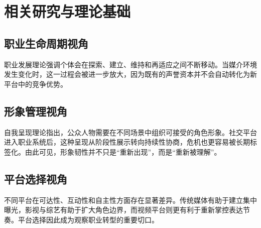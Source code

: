 \chapter{相关研究与理论基础}

\section{职业生命周期视角}

职业发展理论强调个体会在探索、建立、维持和再适应之间不断移动。当媒介环境发生变化时，这一过程会被进一步放大，因为既有的声誉资本并不会自动转化为新平台中的竞争优势。

\section{形象管理视角}

自我呈现理论指出，公众人物需要在不同场景中组织可接受的角色形象。社交平台进入职业系统后，这种呈现从阶段性展示转向持续性协商，危机也更容易被长期标签化。由此可见，形象韧性并不只是“重新出现”，而是“重新被理解”。

\section{平台选择视角}

不同平台在可达性、互动性和自主性方面存在显著差异。传统媒体有助于建立集中曝光，影视与综艺有助于扩大角色边界，而视频平台则更有利于重新掌控表达节奏。平台选择因此成为观察职业转型的重要切口。
